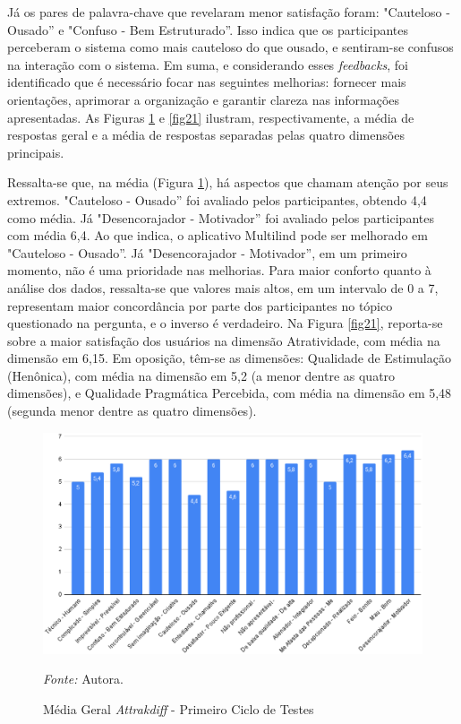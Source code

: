 Já os pares de palavra-chave que revelaram menor satisfação foram: "Cauteloso - Ousado'' e "Confuso - Bem Estruturado''. Isso indica que os participantes perceberam o sistema como mais cauteloso do que ousado, e 
sentiram-se confusos na interação com o sistema. Em suma, e considerando esses \textit{feedbacks}, foi identificado que é necessário focar nas seguintes melhorias: fornecer mais orientações, aprimorar a 
organização e garantir clareza nas informações apresentadas. As Figuras \ref{fig20} e \ref{fig21} ilustram, respectivamente, a média de respostas geral e a média de respostas separadas pelas quatro dimensões principais. 

Ressalta-se que, na média (Figura \ref{fig20}), há aspectos que chamam atenção por seus extremos. "Cauteloso - Ousado'' foi avaliado pelos participantes, obtendo 4,4 como média. Já "Desencorajador - Motivador'' foi avaliado pelos 
participantes com média 6,4. Ao que indica, o aplicativo Multilind pode ser melhorado em "Cauteloso - Ousado''. Já "Desencorajador - Motivador'', em um primeiro momento, não é uma prioridade nas melhorias. Para maior conforto 
quanto à análise dos dados, ressalta-se que valores mais altos, em um intervalo de 0 a 7, representam maior concordância por parte dos participantes no tópico questionado na pergunta, e o inverso é verdadeiro. Na Figura \ref{fig21}, 
reporta-se sobre a maior satisfação dos usuários na dimensão Atratividade, com média na dimensão em 6,15. Em oposição, têm-se as dimensões: Qualidade de Estimulação (Henônica), com média na dimensão em 5,2 (a menor dentre 
as quatro dimensões), e Qualidade Pragmática Percebida, com média na dimensão em 5,48 (segunda menor dentre as quatro dimensões).

\begin{figure}[h!]
	\centering
	\caption{Média Geral \textit{Attrakdiff} - Primeiro Ciclo de Testes}
	\begin{adjustbox}{center}
		\includegraphics[width=1\textwidth]{figuras/media-geral.eps}
	\end{adjustbox}
	\begin{tablenotes}[flushleft]
		\centering
		\item \textit{Fonte:} Autora.
	\end{tablenotes}
	\label{fig20}
\end{figure}

